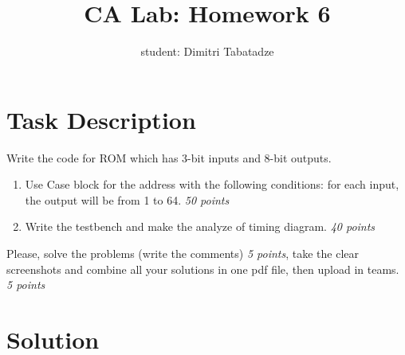 \documentclass{article}
\title{CA Lab: Homework 6}
\author{student: Dimitri Tabatadze}
\newcommand{\points}[1]{{\footnotesize{\color{red}\textit{#1 points}}}}
\begin{document}
    \maketitle

    \section*{Task Description} 
    
    Write the code for ROM which has 3-bit inputs and 8-bit outputs.

    \begin{enumerate}
        \item Use Case block for the address with the following conditions: for each input, the output will be from 1 to 64. \points{50}
        \item Write the testbench and make the analyze of timing diagram. \points{40}
    \end{enumerate}

    Please, solve the problems (write the comments) \points{5}, take the clear screenshots and combine all your solutions in one pdf file, then upload in teams. \points{5}

    \section*{Solution}
\end{document}
